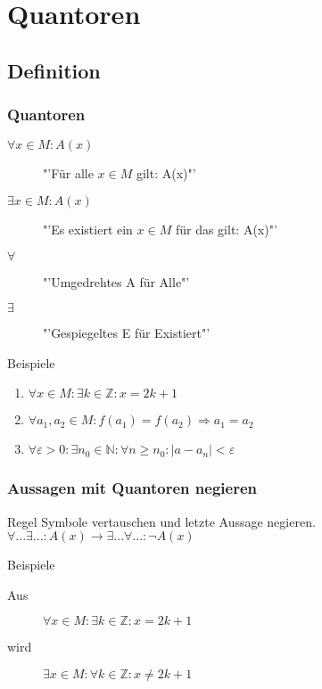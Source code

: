 \section{Quantoren}
\subsection{Definition}
\begin{frame}
  \frametitle{Quantoren}
  \begin{definition}
    \begin{description}
      \item[$\forall x \in M: A(x)$] "'Für alle $x \in M$ gilt: A(x)"' 
      \item[$\exists x \in M: A(x)$] "'Es existiert ein $x \in M$ für das gilt: A(x)"'
    \end{description}
  \end{definition} \pause
  \begin{description}
    \item[$\forall$] "'Umgedrehtes A für Alle"'
    \item[$\exists$] "'Gespiegeltes E für Existiert"'
  \end{description}
  \begin{exampleblock}{Beispiele}
    \begin{enumerate}
      \item $\forall x \in M: \exists k \in \mathbb{Z}: x = 2k+1$
      \item $\forall a_1, a_2 \in M: f(a_1) = f(a_2) \Rightarrow a_1 = a_2$
      \item $\forall \varepsilon > 0: \exists n_0 \in \mathbb{N}: \forall n \geq n_0: |a-a_n| < \varepsilon$
    \end{enumerate}
  \end{exampleblock}
\end{frame}
\begin{frame}
  \frametitle{Aussagen mit Quantoren negieren}
  \begin{block}{Regel}
    Symbole vertauschen und letzte Aussage negieren. $\forall ... \exists ... : A(x) \longrightarrow \exists ... \forall ... : \neg A(x)$
  \end{block} \pause
  \begin{exampleblock}{Beispiele}
    \begin{description}
      \item[Aus] $\forall x \in M: \exists k \in \mathbb{Z}: x = 2k+1$ \pause
      \item[wird] $\exists x \in M: \forall k \in \mathbb{Z}: x \neq 2k+1$
    \end{description}
  \end{exampleblock}
\end{frame}
